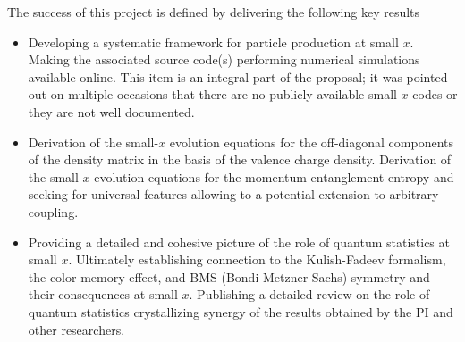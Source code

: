The success of this project is defined by delivering the following key results 
\begin{itemize}
    \item Developing a systematic framework for particle production at 
		small $x$. Making the associated source code(s) performing numerical simulations available online. 
		This item is an integral part 
		of the proposal; it was pointed out on multiple occasions that 
		there are no publicly available small $x$ codes or they are not well 
		documented. 
    \item Derivation of the 
		small-$x$ evolution equations for the off-diagonal components 
		of the density matrix in the basis of the valence charge density.
		Derivation of the small-$x$ evolution equations for the momentum 
		entanglement entropy and seeking for universal features allowing to 
		a potential extension to arbitrary coupling.  
    \item Providing a detailed and cohesive picture of the role of 
		quantum statistics at small $x$. Ultimately establishing 
		connection to 
		the Kulish-Fadeev formalism, the color memory effect, and 
		BMS (Bondi-Metzner-Sachs) symmetry and their consequences at small $x$.   
		Publishing a detailed review on the role of quantum statistics 
		crystallizing synergy of the results obtained by the PI and 
		other researchers. 
\end{itemize}
